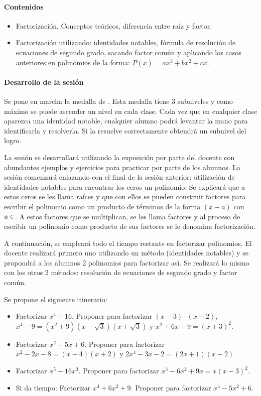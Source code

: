 \paragraph{Contenidos}
\begin{itemize}
	\item Factorización. Conceptos teóricos, diferencia entre raíz y factor.
	\item Factorización utilizando: identidades notables, fórmula de resolución de ecuaciones de segundo grado, sacando factor común y aplicando los casos anteriores en polinomios de la forma: $P(x) = ax^3+bx^2+cx$.
\end{itemize}

\paragraph{Desarrollo de la sesión}

Se pone en marcha la medalla de .
%
Esta medalla tiene 3 subniveles y como máximo se puede ascender un nivel en cada clase.
%
Cada vez que en cualquier clase aparezca una identidad notable, cualquier alumno podrá levantar la mano para identificarla y resolverla. 
%
Si la resuelve correctamente obtendrá un subnivel del logro.

La sesión se desarrollará utilizando la exposición por parte del docente con abundantes ejemplos y ejercicios para practicar por parte de los alumnos.
%
La sesión comenzará enlazando con el final de la sesión anterior: utilización de identidades notables para encontrar los ceros un polinomio.
%
Se explicará que a estos ceros se les llama raíces y que con ellos se pueden construir factores para escribir el polinomio como un producto de términos de la forma $(x-a)$ con $a\in\real$.
%
A estos factores que se multiplican, se les llama factores y al proceso de escribir un polinomio como producto de sus factores se le denomina factorización.

A continuación, se empleará todo el tiempo restante en factorizar polinomios.
%
El docente realizará primero uno utilizando un método (identidades notables) y se propondrá a los alumnos 2 polinomios para factorizar así.
%
Se realizará lo mismo con los otros 2 métodos: resolución de ecuaciones de segundo grado y factor común.

Se propone el siguiente itinerario:

\begin{itemize}
	\item Factorizar $x^4-16$. Proponer para factorizar $(x-3)·(x-2)$, $x^4-9 = (x^2+9)(x-\sqrt{3})(x+\sqrt{3})$ y $x^2+6x+9 = (x+3)^2$.
	
	\item Factorizar $x^2-5x+6$. Proponer para factorizar $x^2-2x-8 = (x-4)(x+2)$ y $2x^4-3x-2 = (2x+1)(x-2)$
	\item Factorizar $x^5-16x^3$. Proponer para factorizar $x^3-6x^2+9x = x(x-3)^2$.
	\item Si da tiempo: Factorizar $x^4+6x^2+9$. Proponer para factorizar $x^4-5x^2+6$.
\end{itemize}





